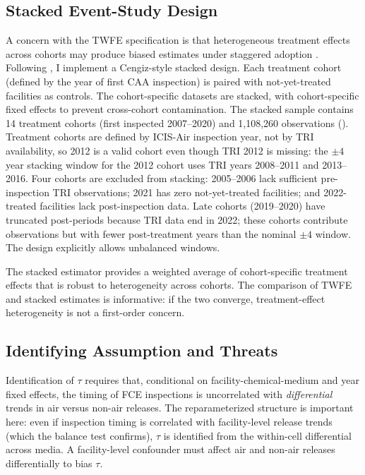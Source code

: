 \documentclass[12pt]{article}
\begin{document}
\subsection{Stacked Event-Study Design}

A concern with the TWFE specification is that heterogeneous treatment effects across cohorts may produce biased estimates under staggered adoption \citep{callawaysantanna2021, dechaisemartin2020, sunab2021}. Following \citet{callawaysantanna2021}, I implement a Cengiz-style stacked design. Each treatment cohort (defined by the year of first CAA inspection) is paired with not-yet-treated facilities as controls. The cohort-specific datasets are stacked, with cohort-specific fixed effects to prevent cross-cohort contamination. The stacked sample contains 14 treatment cohorts (first inspected 2007--2020) and 1,108,260 observations (). Treatment cohorts are defined by ICIS-Air inspection year, not by TRI availability, so 2012 is a valid cohort even though TRI 2012 is missing: the $\pm 4$ year stacking window for the 2012 cohort uses TRI years 2008--2011 and 2013--2016. Four cohorts are excluded from stacking: 2005--2006 lack sufficient pre-inspection TRI observations; 2021 has zero not-yet-treated facilities; and 2022-treated facilities lack post-inspection data. Late cohorts (2019--2020) have truncated post-periods because TRI data end in 2022; these cohorts contribute observations but with fewer post-treatment years than the nominal $\pm 4$ window. The design explicitly allows unbalanced windows.

The stacked estimator provides a weighted average of cohort-specific treatment effects that is robust to heterogeneity across cohorts. The comparison of TWFE and stacked estimates is informative: if the two converge, treatment-effect heterogeneity is not a first-order concern.

\subsection{Identifying Assumption and Threats}

Identification of $\tau$ requires that, conditional on facility-chemical-medium and year fixed effects, the timing of FCE inspections is uncorrelated with \textit{differential} trends in air versus non-air releases. The reparameterized structure is important here: even if inspection timing is correlated with facility-level release trends (which the balance test confirms), $\tau$ is identified from the within-cell differential across media. A facility-level confounder must affect air and non-air releases differentially to bias $\tau$.
\end{document}
